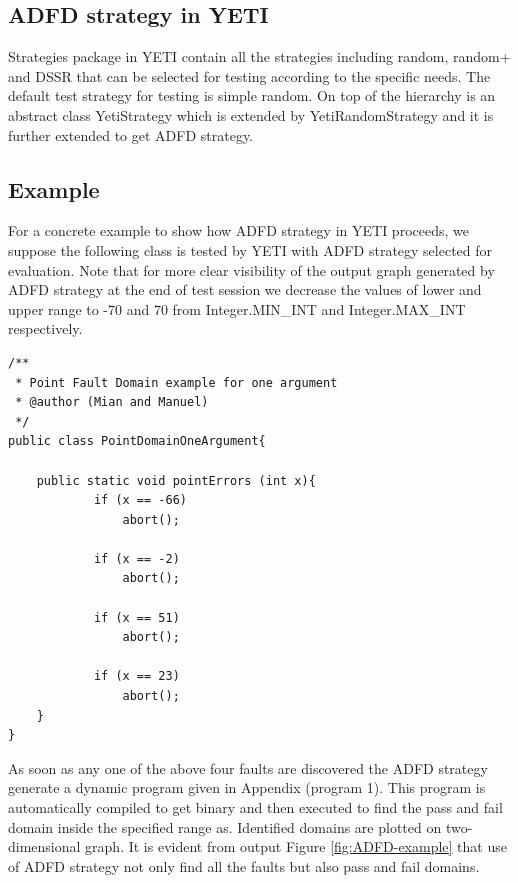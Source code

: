 \documentclass[runningheads,a4paper]{llncs}
\begin{document}
 \subsection{ADFD strategy in YETI}
Strategies package in YETI contain all the strategies including random, random+ and DSSR that can be selected for testing according to the specific needs. The default test strategy for testing is simple random. On top of the hierarchy is an abstract class YetiStrategy which is extended by YetiRandomStrategy and it is further extended to get ADFD strategy.
 

\subsection{Example}\label{sec:example}
For a concrete example to show how ADFD strategy in YETI proceeds, we suppose the following class is tested by YETI with ADFD strategy selected for evaluation. Note that for more clear visibility of the output graph generated by ADFD strategy at the end of test session we decrease the values of lower and upper range to -70 and 70 from Integer.MIN\_INT and Integer.MAX\_INT respectively. 


\begin{lstlisting}
/**
 * Point Fault Domain example for one argument
 * @author (Mian and Manuel)
 */
public class PointDomainOneArgument{

	public static void pointErrors (int x){
     		if (x == -66)
       			abort();
     
     		if (x == -2)
     			abort();
      				
     		if (x == 51)
     			abort();
     
     		if (x == 23)
     			abort();
	}
}
\end{lstlisting}


As soon as any one of the above four faults are discovered the ADFD strategy generate a dynamic program given in Appendix (program 1). This program is automatically compiled to get binary and then executed to find the pass and fail domain inside the specified range as. Identified domains are plotted on two-dimensional graph. It is evident from output Figure \ref{fig:ADFD-example} that use of ADFD strategy not only find all the faults but also pass and fail domains.
\end{document}
